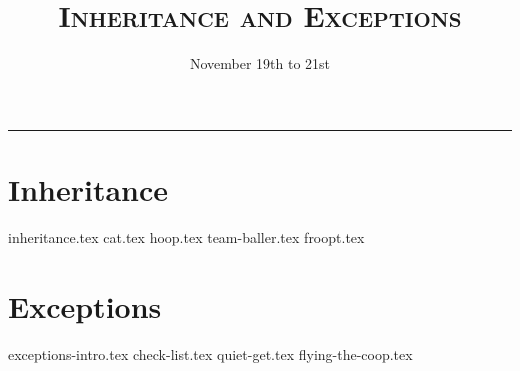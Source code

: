 \documentclass{exam}
\title{\textsc{Inheritance and Exceptions}}
\date{November 19th to 21st}
\begin{document}
\maketitle
\rule{\textwidth}{0.15em}
\fontsize{12}{15}\selectfont


\begin{questions}
\section{Inheritance}
{inheritance.tex}
{cat.tex}
{hoop.tex}
{team-baller.tex}
\newpage
{froopt.tex}

\newpage
\section{Exceptions}
{exceptions-intro.tex}
\newpage
{check-list.tex}
{quiet-get.tex}
{flying-the-coop.tex}


\end{questions}
\end{document}
